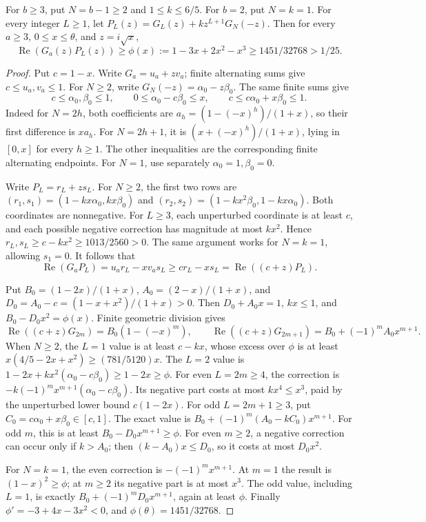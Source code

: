 \begin{lemma}
\label{lem:q117-unified:shortone-symbol}
For \(b\ge3\), put \(N=b-1\ge2\) and \(1\le k\le6/5\).
For \(b=2\), put \(N=k=1\). For every integer \(L\ge1\),
let \(P_L(z)=G_L(z)+kz^{L+1}G_N(-z)\). Then for every
\(a\ge3\), \(0\le x\le\theta\), and \(z=i\sqrt x\),
\begin{equation}\label{eq:q117-unified:shortone-symbol}
 \operatorname{Re}(G_a(z)P_L(z))
 \ge\phi(x):=1-3x+2x^2-x^3
 \ge1451/32768>1/25.
\end{equation}
\end{lemma}
\begin{proof}
Put \(c=1-x\). Write \(G_a=u_a+zv_a\); finite alternating
sums give \(c\le u_a,v_a\le1\). For \(N\ge2\), write
\(G_N(-z)=\alpha_0-z\beta_0\). The same finite sums give
\[
 c\le\alpha_0,\beta_0\le1,\qquad
 0\le\alpha_0-c\beta_0\le x,\qquad
 c\le c\alpha_0+x\beta_0\le1.
\]
Indeed for \(N=2h\), both coefficients are
\(a_h=(1-(-x)^h)/(1+x)\), so their first difference is
\(xa_h\). For \(N=2h+1\), it is
\((x+(-x)^h)/(1+x)\), lying in \([0,x]\) for every
\(h\ge1\). The other inequalities are the corresponding finite
alternating endpoints. For \(N=1\), use separately
\(\alpha_0=1,\beta_0=0\).

Write \(P_L=r_L+zs_L\). For \(N\ge2\), the first two rows are
\((r_1,s_1)=(1-kx\alpha_0,kx\beta_0)\) and
\((r_2,s_2)=(1-kx^2\beta_0,1-kx\alpha_0)\).
Both coordinates are nonnegative. For \(L\ge3\), each unperturbed
coordinate is at least \(c\), and each possible negative
correction has magnitude at most \(kx^2\). Hence
\(r_L,s_L\ge c-kx^2\ge1013/2560>0\).
The same argument works for \(N=k=1\), allowing \(s_1=0\).
It follows that
\[
 \operatorname{Re}(G_aP_L)=u_ar_L-xv_as_L
 \ge cr_L-xs_L=\operatorname{Re}((c+z)P_L).
\]

Put \(B_0=(1-2x)/(1+x)\), \(A_0=(2-x)/(1+x)\), and
\(D_0=A_0-c=(1-x+x^2)/(1+x)>0\).
Then \(D_0+A_0x=1\), \(kx\le1\),
and \(B_0-D_0x^2=\phi(x)\). Finite geometric division gives
\[
 \operatorname{Re}((c+z)G_{2m})=B_0(1-(-x)^m),\qquad
 \operatorname{Re}((c+z)G_{2m+1})
       =B_0+(-1)^mA_0x^{m+1}.
\]
When \(N\ge2\), the \(L=1\) value is at least \(c-kx\),
whose excess over \(\phi\) is at least
\(x(4/5-2x+x^2)\ge(781/5120)x\).
The \(L=2\) value is
\(1-2x+kx^2(\alpha_0-c\beta_0)\ge1-2x\ge\phi\).
For even \(L=2m\ge4\), the correction is
\(-k(-1)^mx^{m+1}(\alpha_0-c\beta_0)\).
Its negative part costs at most \(kx^4\le x^3\), paid by
the unperturbed lower bound \(c(1-2x)\).
For odd \(L=2m+1\ge3\), put
\(C_0=c\alpha_0+x\beta_0\in[c,1]\).
The exact value is \(B_0+(-1)^m(A_0-kC_0)x^{m+1}\).
For odd \(m\), this is at least \(B_0-D_0x^{m+1}\ge\phi\).
For even \(m\ge2\), a negative correction can occur only if
\(k>A_0\); then \((k-A_0)x\le D_0\), so it costs at most
\(D_0x^2\).

For \(N=k=1\), the even correction is
\(-(-1)^mx^{m+1}\). At \(m=1\) the result is
\((1-x)^2\ge\phi\); at \(m\ge2\) its negative part is at
most \(x^3\). The odd value, including \(L=1\), is exactly
\(B_0+(-1)^mD_0x^{m+1}\), again at least \(\phi\).
Finally \(\phi'=-3+4x-3x^2<0\), and
\(\phi(\theta)=1451/32768\).
\end{proof}

